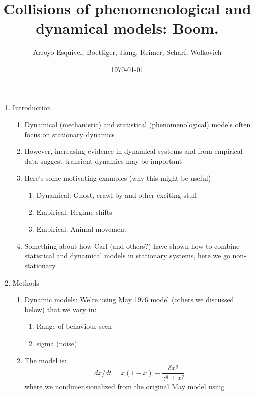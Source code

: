 \documentclass[11pt,letter]{article}
\begin{document}

\renewcommand{\refname}{\CHead{}}

\title{Collisions of phenomenological and dynamical models: Boom.}
\author{Arroyo-Esquivel, Boettiger, Jiang, Reimer, Scharf, Wolkovich}
\date{\today}
\maketitle

\begin{enumerate}
\item Introduction
\begin{enumerate} %
\item Dynamical (mechanistic) and statistical (phenomenological) models often focus on stationary dynamics 
\item However, increasing evidence in dynamical systems and from empirical data suggest transient dynamics may be important
\item Here's some motivating examples (why this might be useful)
\begin{enumerate}
\item Dynamical: Ghost, crawl-by and other exciting stuff
\item Empirical: Regime shifts
\item Empirical: Animal movement 
\end{enumerate}
\item Something about how Carl (and others?) have shown how to combine statistical and dynamical models in stationary systems, here we go non-stationary
\end{enumerate}
\item Methods
\begin{enumerate}
\item Dynamic models: We're using May 1976 model (others we discussed below) that we vary in:
\begin{enumerate}
\item Range of behaviour seen
\item sigma (noise)
\end{enumerate}
\item The model is:
\[ dx/dt = x(1-x) - \frac{\delta x^q}{\gamma^q + x^q} \]
where we nondimensionalized from the original May model using

\end{enumerate}
\end{enumerate}
\end{document}
